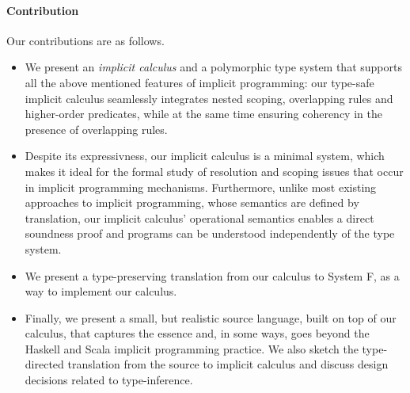 \paragraph{Contribution} 
Our contributions are as follows.
\begin{itemize}
\item We present an \emph{implicit calculus} and a polymorphic type
  system that supports all the
  above mentioned features of implicit  programming: 
our type-safe implicit calculus seamlessly integrates nested scoping,
overlapping rules and higher-order predicates, while at the same time
ensuring coherency in the presence of overlapping rules. 

\item Despite its expressivness, our implicit calculus is a 
minimal system, which makes it ideal for the formal study of
resolution and scoping issues that occur in implicit programming
mechanisms. Furthermore, unlike most existing approaches to implicit
programming, whose semantics are defined by translation, 
our implicit calculus' operational semantics enables a direct
soundness proof and programs can be understood independently of the
type system.  

\item We present a type-preserving translation from our calculus to
  System F, as a way to implement our calculus. 

\item Finally, we present a small, but realistic source language,
  built on top of our calculus, that captures the essence and, in some
  ways, goes beyond the Haskell and Scala implicit programming
  practice. We also sketch the type-directed translation from the
  source to implicit calculus and discuss design decisions related to
  type-inference.

\end{itemize}



